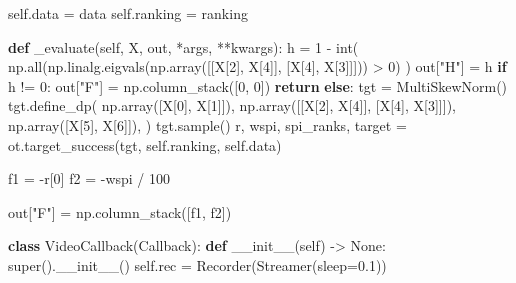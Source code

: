 \documentclass[
  authoryear,
  preprint,
  3p]{elsarticle}
\newenvironment{Shaded}{\begin{snugshade}}{\end{snugshade}}
\newcommand{\BuiltInTok}[1]{\textcolor[rgb]{0.00,0.23,0.31}{#1}}
\newcommand{\ControlFlowTok}[1]{\textcolor[rgb]{0.00,0.23,0.31}{\textbf{#1}}}
\newcommand{\DecValTok}[1]{\textcolor[rgb]{0.68,0.00,0.00}{#1}}
\newcommand{\FloatTok}[1]{\textcolor[rgb]{0.68,0.00,0.00}{#1}}
\newcommand{\FunctionTok}[1]{\textcolor[rgb]{0.28,0.35,0.67}{#1}}
\newcommand{\KeywordTok}[1]{\textcolor[rgb]{0.00,0.23,0.31}{\textbf{#1}}}
\newcommand{\NormalTok}[1]{\textcolor[rgb]{0.00,0.23,0.31}{#1}}
\newcommand{\OperatorTok}[1]{\textcolor[rgb]{0.37,0.37,0.37}{#1}}
\newcommand{\StringTok}[1]{\textcolor[rgb]{0.13,0.47,0.30}{#1}}
\newcommand{\VariableTok}[1]{\textcolor[rgb]{0.07,0.07,0.07}{#1}}
\begin{document}
\begin{Shaded}
\begin{Highlighting}[]
        \VariableTok{self}\NormalTok{.data }\OperatorTok{=}\NormalTok{ data}
        \VariableTok{self}\NormalTok{.ranking }\OperatorTok{=}\NormalTok{ ranking}

    \KeywordTok{def}\NormalTok{ \_evaluate(}\VariableTok{self}\NormalTok{, X, out, }\OperatorTok{*}\NormalTok{args, }\OperatorTok{**}\NormalTok{kwargs):}
\NormalTok{        h }\OperatorTok{=} \DecValTok{1} \OperatorTok{{-}} \BuiltInTok{int}\NormalTok{(}
\NormalTok{            np.}\BuiltInTok{all}\NormalTok{(np.linalg.eigvals(np.array([[X[}\DecValTok{2}\NormalTok{], X[}\DecValTok{4}\NormalTok{]], [X[}\DecValTok{4}\NormalTok{], X[}\DecValTok{3}\NormalTok{]]])) }\OperatorTok{\textgreater{}} \DecValTok{0}\NormalTok{)}
\NormalTok{        )}
\NormalTok{        out[}\StringTok{"H"}\NormalTok{] }\OperatorTok{=}\NormalTok{ h}
        \ControlFlowTok{if}\NormalTok{ h }\OperatorTok{!=} \DecValTok{0}\NormalTok{:}
\NormalTok{            out[}\StringTok{"F"}\NormalTok{] }\OperatorTok{=}\NormalTok{ np.column\_stack([}\DecValTok{0}\NormalTok{, }\DecValTok{0}\NormalTok{])}
            \ControlFlowTok{return}
        \ControlFlowTok{else}\NormalTok{:}
\NormalTok{            tgt }\OperatorTok{=}\NormalTok{ MultiSkewNorm()}
\NormalTok{            tgt.define\_dp(}
\NormalTok{                np.array([X[}\DecValTok{0}\NormalTok{], X[}\DecValTok{1}\NormalTok{]]),}
\NormalTok{                np.array([[X[}\DecValTok{2}\NormalTok{], X[}\DecValTok{4}\NormalTok{]], [X[}\DecValTok{4}\NormalTok{], X[}\DecValTok{3}\NormalTok{]]]),}
\NormalTok{                np.array([X[}\DecValTok{5}\NormalTok{], X[}\DecValTok{6}\NormalTok{]]),}
\NormalTok{            )}
\NormalTok{            tgt.sample()}
\NormalTok{            r, wspi, spi\_ranks, target }\OperatorTok{=}\NormalTok{ ot.target\_success(tgt, }\VariableTok{self}\NormalTok{.ranking, }\VariableTok{self}\NormalTok{.data)}

\NormalTok{            f1 }\OperatorTok{=} \OperatorTok{{-}}\NormalTok{r[}\DecValTok{0}\NormalTok{]}
\NormalTok{            f2 }\OperatorTok{=} \OperatorTok{{-}}\NormalTok{wspi }\OperatorTok{/} \DecValTok{100}

\NormalTok{            out[}\StringTok{"F"}\NormalTok{] }\OperatorTok{=}\NormalTok{ np.column\_stack([f1, f2])}


\KeywordTok{class}\NormalTok{ VideoCallback(Callback):}
    \KeywordTok{def} \FunctionTok{\_\_init\_\_}\NormalTok{(}\VariableTok{self}\NormalTok{) }\OperatorTok{{-}\textgreater{}} \VariableTok{None}\NormalTok{:}
        \BuiltInTok{super}\NormalTok{().}\FunctionTok{\_\_init\_\_}\NormalTok{()}
        \VariableTok{self}\NormalTok{.rec }\OperatorTok{=}\NormalTok{ Recorder(Streamer(sleep}\OperatorTok{=}\FloatTok{0.1}\NormalTok{))}


\end{Highlighting}
\end{Shaded}
\end{document}
